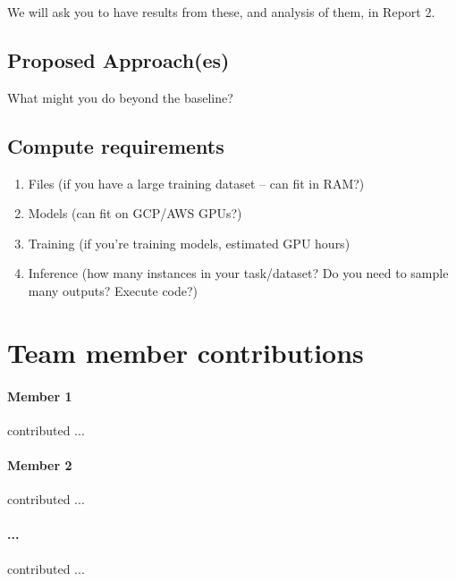 \documentclass[11pt,a4paper]{article}
\begin{document}
We will ask you to have results from these, and analysis of them, in Report 2.

\subsection{Proposed Approach(es)}
What might you do beyond the baseline?

\subsection{Compute requirements}
\begin{enumerate}
  \item Files (if you have a large training dataset -- can fit in RAM?)
  \item Models (can fit on GCP/AWS GPUs?)
  \item Training (if you're training models, estimated GPU hours)
  \item Inference (how many instances in your task/dataset? Do you need to sample many outputs? Execute code?)
\end{enumerate}

\clearpage
\section{Team member contributions}
\paragraph{Member 1} contributed ...

\paragraph{Member 2} contributed ...

\paragraph{...} contributed ...

\clearpage



\end{document}
